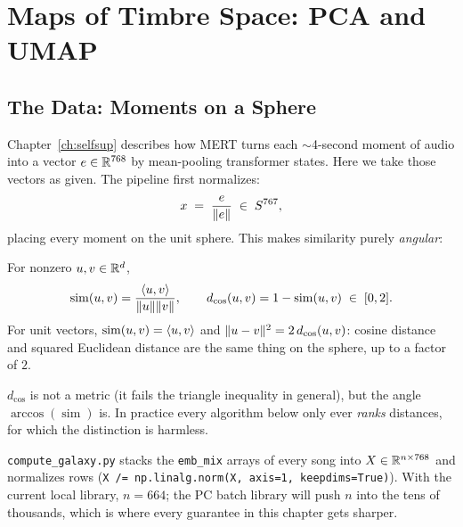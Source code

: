 \chapter{Maps of Timbre Space: PCA and UMAP}\label{ch:timbre}

\section{The Data: Moments on a Sphere}

Chapter~\ref{ch:selfsup} describes how MERT turns each $\sim$4-second moment
of audio into a vector $e \in \mathbb{R}^{768}$ by mean-pooling transformer states.
Here we take those vectors as given. The pipeline first normalizes:
\[
x \;=\; \frac{e}{\lVert e\rVert} \;\in\; S^{767},
\]
placing every moment on the unit sphere. This makes similarity purely
\emph{angular}:

\begin{definition}\label{def:cosine}
For nonzero $u, v \in \mathbb{R}^d$,
\[
\operatorname{sim}(u,v) = \frac{\langle u,v\rangle}{\lVert u\rVert\lVert v\rVert},
\qquad
d_{\cos}(u,v) = 1 - \operatorname{sim}(u,v) \;\in\; [0, 2].
\]
For unit vectors, $\operatorname{sim}(u,v) = \langle u,v\rangle$ and
$\lVert u - v\rVert^2 = 2\, d_{\cos}(u,v)$: cosine distance and squared Euclidean
distance are the same thing on the sphere, up to a factor of $2$.
\end{definition}

\begin{remark}
$d_{\cos}$ is not a metric (it fails the triangle inequality in general), but
the angle $\arccos(\operatorname{sim})$ is. In practice every algorithm below
only ever \emph{ranks} distances, for which the distinction is harmless.
\end{remark}

\begin{incode}
\texttt{compute\_galaxy.py} stacks the \texttt{emb\_mix} arrays of every song
into $X \in \mathbb{R}^{n \times 768}$ and normalizes rows
(\texttt{X /= np.linalg.norm(X, axis=1, keepdims=True)}). With the current
local library, $n = 664$; the PC batch library will push $n$ into the tens of
thousands, which is where every guarantee in this chapter gets sharper.
\end{incode}

